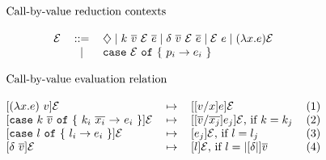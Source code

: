 \(\begin{array}{c}
\multicolumn{1}{l}{\text{Call-by-value reduction contexts}}\\
\\
\begin{tabular}{@{}l c l}
$\Ctx$ 	& ::= 	& 	$\Hole \mid k~\Ov{v}~\Ctx~\Ov{e} \mid \delta~\Ov{v}~\Ctx~\Ov{e} \mid \Ctx~e \mid (\Lam{x}{e})\Ctx  $ \\
		& $\mid$ &	\lst{case} $\Ctx$ \lst{of} \{ $p_i \rightarrow e_i$ \}				\\
		& & \\
\end{tabular} \\
\multicolumn{1}{l}{\text{Call-by-value evaluation relation}}\\
\\
\begin{tabular}{@{}l c l r}
$[(\Lam{x}{e})~v]\Ctx$   & $\mapsto$ 	& 	$[[v/x]e]\Ctx$					    & (1)     \\
$[$\lst{case} $k~\Ov{v}$ \lst{of} \{ $k_i~\overline{x_i}$ $\rightarrow$ $e_i$  \}$]\Ctx$   & $\mapsto$ 	& 	$[[\overline{v}/\overline{x_j}]e_j]\Ctx$, if $k = k_j$	& (2)    \\
$[$\lst{case} $l$ \lst{of} \{ $l_i \rightarrow e_i$ \}$]\Ctx$   & $\mapsto$ 	& 	$[e_j]\Ctx$, if $l = l_j$	& (3)    \\
$[\delta~\overline{v}]\Ctx$   & $\mapsto$ 	& 	$[l]\Ctx$, if $l = |[\Prim|]\overline{v}$					    & (4)     \\

\end{tabular}
\end{array}\)

